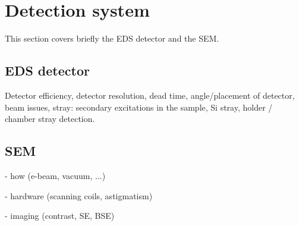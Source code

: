 














\section{Detection system}
\label{sec:theory:detectionsystem}

This section covers briefly the EDS detector and the SEM.


\subsection{EDS detector}
\label{sec:theory:edsdetector}

Detector efficiency, detector resolution, dead time, angle/placement of detector, beam issues, stray: secondary excitations in the sample, Si stray, holder / chamber stray detection.





\subsection{SEM}
\label{sec:theory:sem}


- how (e-beam, vacuum, ...)


- hardware (scanning coils, astigmatism)


- imaging (contrast, SE, BSE)






